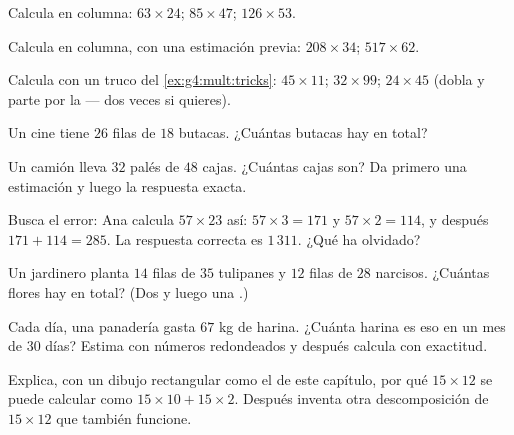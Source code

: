 \begin{exercise}[$\star$]\label{exo:g4:mult:3}
Calcula en columna: $63 \times 24$; \quad $85 \times 47$; \quad
$126 \times 53$.
\end{exercise}

\begin{exercise}[$\star$]\label{exo:g4:mult:4}
Calcula en columna, con una estimación previa: $208 \times 34$; \quad
$517 \times 62$.
\end{exercise}

\begin{exercise}[$\star$]\label{exo:g4:mult:5}
Calcula con un truco del \cref{ex:g4:mult:tricks}:
$45 \times 11$; \quad $32 \times 99$; \quad $24 \times 45$ (dobla
y parte por la  --- dos veces si quieres).
\end{exercise}

\begin{exercise}[$\star$]\label{exo:g4:mult:6}
Un cine tiene $26$ filas de $18$ butacas. ¿Cuántas butacas hay en total?
\end{exercise}

\begin{exercise}[$\star$]\label{exo:g4:mult:7}
Un camión lleva $32$ palés de $48$ cajas. ¿Cuántas cajas son? Da
primero una estimación y luego la respuesta exacta.
\end{exercise}

\begin{exercise}[$\star$]\label{exo:g4:mult:8}
Busca el error: Ana calcula $57 \times 23$ así:
$57 \times 3 = 171$ y $57 \times 2 = 114$, y después 
$171 + 114 = 285$. La respuesta correcta es $1\,311$. ¿Qué ha
olvidado?
\end{exercise}

\begin{exercise}[$\star\star$]\label{exo:g4:mult:9}
Un jardinero planta $14$ filas de $35$ tulipanes y $12$ filas de $28$
narcisos. ¿Cuántas flores hay en total? (Dos  y luego una .)
\end{exercise}

\begin{exercise}[$\star\star$]\label{exo:g4:mult:10}
Cada día, una panadería gasta $67$ kg de harina. ¿Cuánta harina es
eso en un mes de $30$ días? Estima con números redondeados y después
calcula con exactitud.
\end{exercise}

\begin{exercise}[$\star\star$]\label{exo:g4:mult:11}
Explica, con un dibujo rectangular como el de este capítulo, por qué
$15 \times 12$ se puede calcular como $15 \times 10 + 15 \times 2$.
Después inventa otra descomposición de $15 \times 12$ que también funcione.
\end{exercise}
